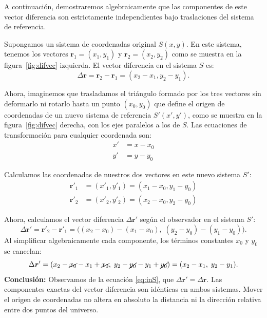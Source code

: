 \documentclass[11pt,a4paper]{book}
\begin{document}
A continuación, demostraremos algebraicamente que las componentes de este vector diferencia  son estrictamente independientes bajo traslaciones del sistema de referencia.


Supongamos un sistema de coordenadas original $S(x,y)$. En este sistema, tenemos los vectores $\boldsymbol{r}_1 = (x_1, y_1)$ y $\boldsymbol{r}_2 = (x_2, y_2)$ como se muestra en la figura~\ref{fig:difvec} izquierda. El vector diferencia en el sistema $S$ es:
\begin{equation}
\label{eq:inS}
    \Delta\boldsymbol{r} = \boldsymbol{r}_2 - \boldsymbol{r}_1 = (x_2 - x_1, y_2 - y_1).
\end{equation}

Ahora, imaginemos que trasladamos el triángulo formado por los tres vectores sin deformarlo ni rotarlo hasta un punto $(x_0,y_0)$ que define el origen de coordenadas de un nuevo sistema de referencia $S'(x', y')$, como se muestra en la figura~\ref{fig:difvec} derecha, con los ejes paralelos a los de $S$. Las ecuaciones de transformación para cualquier coordenada son:
\begin{align}
    x' &= x - x_0 \\
    y' &= y - y_0
\end{align}

Calculamos las coordenadas de nuestros dos vectores en este nuevo sistema $S'$:
\begin{align*}
    \boldsymbol{r}'_1 &= (x'_1,y'_1) = (x_1 - x_0, y_1 - y_0) \\
    \boldsymbol{r}'_2 &= (x'_2,y'_2) = (x_2 - x_0, y_2 - y_0)
\end{align*}

Ahora, calculamos el vector diferencia $\Delta\boldsymbol{r}'$ según el observador en el sistema $S'$:
\begin{equation}
    \Delta\boldsymbol{r}' = \boldsymbol{r}'_2 - \boldsymbol{r}'_1 = \big((x_2 - x_0) - (x_1 - x_0), \; (y_2 - y_0) - (y_1 - y_0)\big).
\end{equation}
Al simplificar algebraicamente cada componente, los términos constantes $x_0$ y $y_0$ se cancelan:
\begin{equation}
    \Delta\boldsymbol{r}' = (x_2 - \cancel{x_0} - x_1 + \cancel{x_0}, \; y_2 - \cancel{y_0} - y_1 + \cancel{y_0}) = (x_2 - x_1, \; y_2 - y_1).
\end{equation}
\textbf{Conclusión:} Observamos de la ecuación \eqref{eq:inS}, que $\Delta\boldsymbol{r}' = \Delta\boldsymbol{r}$. Las componentes exactas del vector diferencia son idénticas en ambos sistemas. Mover el origen de coordenadas no altera en absoluto la distancia ni la dirección relativa entre dos puntos del universo.
\end{document}
